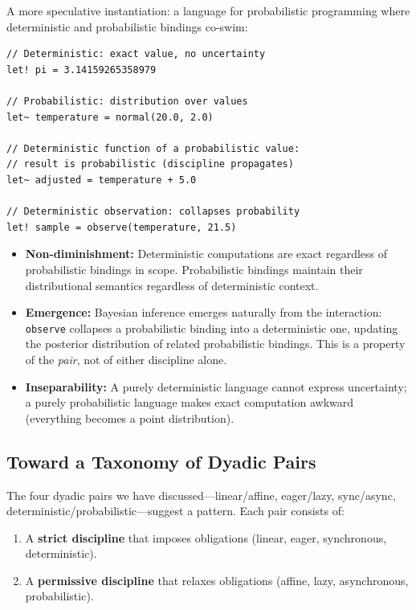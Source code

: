 \documentclass[11pt,a4paper]{article}
\begin{document}
A more speculative instantiation: a language for probabilistic programming
where deterministic and probabilistic bindings co-swim:

\begin{lstlisting}[language=Ephapax, caption={Hypothetical deterministic/probabilistic dyadic bindings.}]
// Deterministic: exact value, no uncertainty
let! pi = 3.14159265358979

// Probabilistic: distribution over values
let~ temperature = normal(20.0, 2.0)

// Deterministic function of a probabilistic value:
// result is probabilistic (discipline propagates)
let~ adjusted = temperature + 5.0

// Deterministic observation: collapses probability
let! sample = observe(temperature, 21.5)
\end{lstlisting}

\begin{itemize}
  \item \textbf{Non-diminishment:} Deterministic computations are exact
    regardless of probabilistic bindings in scope. Probabilistic bindings
    maintain their distributional semantics regardless of deterministic
    context.
  \item \textbf{Emergence:} Bayesian inference emerges naturally from the
    interaction: \lstinline{observe} collapses a probabilistic binding into
    a deterministic one, updating the posterior distribution of related
    probabilistic bindings. This is a property of the \emph{pair}, not of
    either discipline alone.
  \item \textbf{Inseparability:} A purely deterministic language cannot
    express uncertainty; a purely probabilistic language makes exact computation
    awkward (everything becomes a point distribution).
\end{itemize}

\subsection{Toward a Taxonomy of Dyadic Pairs}

The four dyadic pairs we have discussed---linear\slash{}affine, eager\slash{}lazy,
sync\slash{}async, deterministic\slash{}probabilistic---suggest a pattern. Each pair consists
of:

\begin{enumerate}
  \item A \textbf{strict discipline} that imposes obligations (linear, eager,
    synchronous, deterministic).
  \item A \textbf{permissive discipline} that relaxes obligations (affine, lazy,
    asynchronous, probabilistic).
\end{enumerate}
\end{document}
